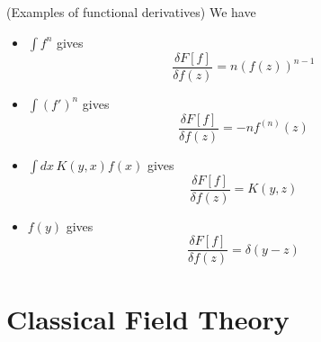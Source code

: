 \vspace{2ex}
\begin{ex}
(Examples of functional derivatives) We have
\begin{itemize}
\item[(i)] $\int f^{n}$ gives
\[\dfrac{\delta F[f]}{\delta f(z)}=n(f(z))^{n-1}\]
\item[(ii)] $\int (f')^{n}$ gives
\[\dfrac{\delta F[f]}{\delta f(z)}=-nf^{(n)}(z)\]
\item[(iii)] $\int dx\, K(y,x)f(x)$ gives
\[\dfrac{\delta F[f]}{\delta f(z)}=K(y,z)\]
\item[(iv)] $f(y)$ gives
\[\dfrac{\delta F[f]}{\delta f(z)}=\delta (y-z)\]
\end{itemize}
\end{ex}
\vspace{2ex}
\section{Classical Field Theory}
